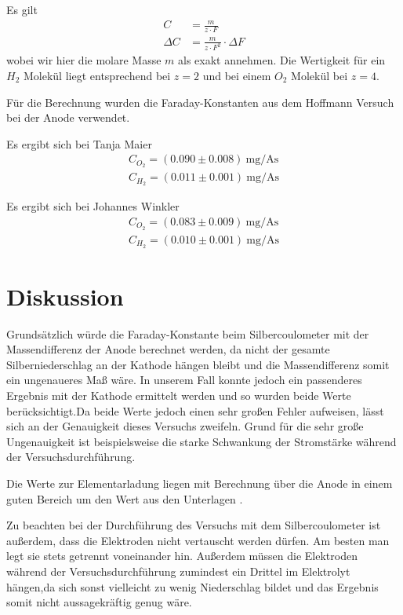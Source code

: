 \documentclass{article}
\begin{document}
Es gilt
\begin{align*}
C &= \frac{m}{z\cdot F} \\
\Delta C &= \frac{m}{z\cdot F^2}\cdot \Delta F
\end{align*}
wobei wir hier die molare Masse $m$ als exakt annehmen. Die Wertigkeit für ein $H_2$ Molekül liegt entsprechend bei $z=2$ und bei einem $O_2$ Molekül bei $z=4$.

Für die Berechnung wurden die Faraday-Konstanten aus dem Hoffmann Versuch bei der Anode verwendet.

Es ergibt sich bei Tanja Maier
\begin{align*}
C_{O_2} = (0.090 \pm 0.008)~\text{mg}/\text{As} \\
C_{H_2} = (0.011 \pm 0.001)~\text{mg}/\text{As} 
\end{align*}

Es ergibt sich bei Johannes Winkler
\begin{align*}
C_{O_2} = (0.083 \pm 0.009)~\text{mg}/\text{As} \\
C_{H_2} = (0.010 \pm 0.001)~\text{mg}/\text{As} 
\end{align*}



\section{Diskussion}

Grundsätzlich  würde  die  Faraday-Konstante  beim  Silbercoulometer  mit  der Massendifferenz der Anode berechnet werden, da nicht der gesamte Silberniederschlag an der Kathode hängen bleibt und die Massendifferenz somit ein ungenaueres Maß wäre. In unserem Fall konnte jedoch ein passenderes Ergebnis mit der Kathode ermittelt werden und so wurden beide Werte berücksichtigt.Da beide Werte jedoch einen sehr großen Fehler aufweisen, lässt sich an der Genauigkeit dieses Versuchs zweifeln. Grund für die sehr große Ungenauigkeit ist beispielsweise  die  starke  Schwankung  der  Stromstärke  während  der  Versuchsdurchführung.

Die Werte zur Elementarladung liegen mit Berechnung über die Anode in einem guten Bereich um den Wert aus den Unterlagen \cite{tu}.

Zu  beachten  bei  der  Durchführung  des  Versuchs  mit  dem  Silbercoulometer ist außerdem, dass die Elektroden nicht vertauscht werden dürfen. Am besten man legt sie stets getrennt voneinander hin. Außerdem müssen die Elektroden während der Versuchsdurchführung zumindest ein Drittel im Elektrolyt hängen,da sich sonst vielleicht zu wenig Niederschlag bildet und das Ergebnis somit nicht aussagekräftig genug wäre.
\end{document}
